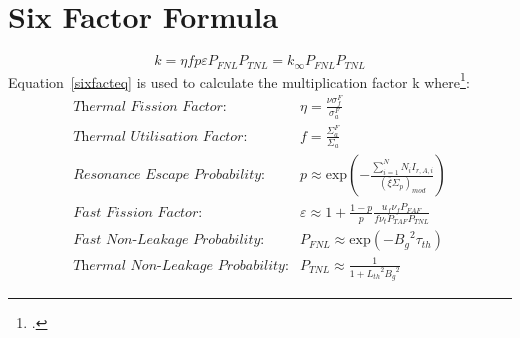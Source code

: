 \chapter{Six Factor Formula}\label{app:sixfact}
\begin{equation}\label{sixfacteq}
    k = \eta f p \varepsilon P_{FNL} P_{TNL} = k_{\infty} P_{FNL} P_{TNL}
\end{equation}
Equation~\ref{sixfacteq} is used to calculate the multiplication factor k where\footcite{nucfundamentals}: \\
\begin{equation}
    \begin{split}
    \textit{Thermal Fission Factor}: & \eta = \frac{\nu \sigma_f^F}{\sigma_a^F} \\
    \textit{Thermal Utilisation Factor}: & f = \frac{\Sigma_a^F}{\Sigma_a} \\
    \textit{Resonance Escape Probability}: & p \approx \mathrm{exp} \left( -\frac{\sum\limits_{i=1}^{N} N_i I_{r,A,i}}{\left( \overline{\xi} \Sigma_p \right)_{mod}} \right) \\
    \textit{Fast Fission Factor}: & \varepsilon \approx 1 + \frac{1-p}{p}\frac{u_f \nu_f P_{FAF}}{f \nu_t P_{TAF} P_{TNL}} \\
    \textit{Fast Non-Leakage Probability}: & P_{FNL} \approx \mathrm{exp} \left( -{B_g}^2 \tau_{th} \right) \\
    \textit{Thermal Non-Leakage Probability}: & P_{TNL} \approx \frac{1}{1+{L_{th}}^2 {B_g}^2}
    \end{split}
\end{equation}